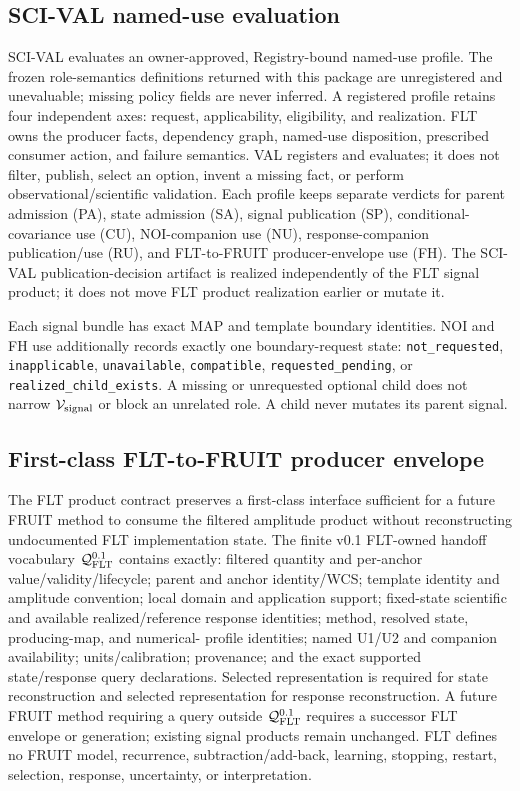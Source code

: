 \subsection{SCI-VAL named-use evaluation}

SCI-VAL evaluates an owner-approved, Registry-bound named-use profile. The
frozen role-semantics definitions returned with this package are unregistered
and unevaluable; missing policy fields are never inferred. A registered profile
retains four
independent axes: request, applicability, eligibility, and realization. FLT
owns the producer facts, dependency graph, named-use disposition, prescribed
consumer action, and failure semantics. VAL registers and evaluates; it does
not filter, publish, select an option, invent a missing fact, or perform
observational/scientific validation. Each profile keeps separate verdicts for
parent admission (PA), state admission (SA), signal publication (SP),
conditional-covariance use (CU), NOI-companion use (NU), response-companion
publication/use (RU), and FLT-to-FRUIT producer-envelope use (FH).
The SCI-VAL publication-decision artifact is realized independently of the FLT
signal product; it does not move FLT product realization earlier or mutate it.

Each signal bundle has exact MAP and template boundary identities. NOI and FH
use additionally records exactly one boundary-request state:
\texttt{not\_requested}, \texttt{inapplicable}, \texttt{unavailable},
\texttt{compatible}, \texttt{requested\_pending}, or
\texttt{realized\_child\_exists}. A missing or unrequested optional child does
not narrow $\mathcal{V}_{\rm signal}$ or block an unrelated role. A child never
mutates its parent signal.

\subsection{First-class FLT-to-FRUIT producer envelope}

The FLT product contract preserves a first-class interface sufficient for a
future FRUIT method to consume the filtered amplitude product without
reconstructing undocumented FLT implementation state. The finite v0.1
FLT-owned handoff vocabulary $\mathcal Q_{\rm FLT}^{0.1}$ contains exactly:
filtered quantity and per-anchor value/validity/lifecycle; parent and anchor
identity/WCS; template identity and amplitude convention; local domain and
application support; fixed-state scientific and available realized/reference
response identities; method, resolved state, producing-map, and numerical-
profile identities; named U1/U2 and companion availability; units/calibration;
provenance; and the exact supported state/response query declarations. Selected
 representation is required for state reconstruction and selected
 representation for response reconstruction. A future FRUIT method
requiring a query outside $\mathcal Q_{\rm FLT}^{0.1}$ requires a successor FLT
envelope or generation; existing signal products remain unchanged. FLT defines
no FRUIT model, recurrence, subtraction/add-back, learning, stopping, restart,
selection, response, uncertainty, or interpretation.


